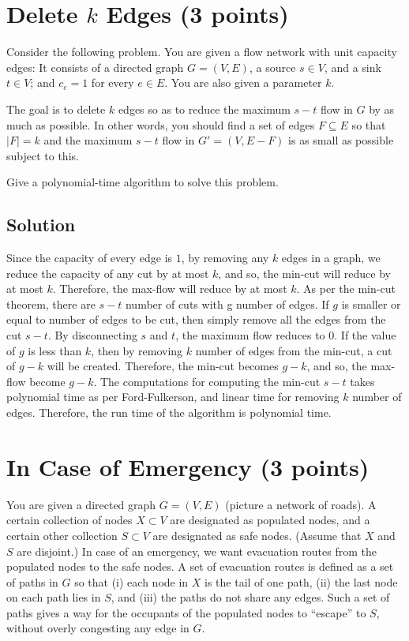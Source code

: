 \documentclass[letter,11pt]{article}
\begin{document}
\section{Delete $k$ Edges (3 points)}

Consider the following problem. You are given a flow network with unit capacity edges: It consists of a directed graph $G = (V, E)$, a source $s \in V$, and a sink $t \in V$; and $c_e = 1$ for every $e \in E$. You are also given a parameter $k$. 


The goal is to delete $k$ edges so as to reduce the maximum $s-t$ flow in $G$ by as much as possible. In other words, you should find a set of edges $F \subseteq E$ so that $|F| = k$ and the maximum $s-t$ flow in $G' = (V, E - F)$ is as small as possible subject to this. 


Give a polynomial-time algorithm to solve this problem.

\subsection{Solution}

Since the capacity of every edge is $1$, by removing any $k$ edges in a graph, we reduce the capacity of any cut by at most $k$, and so, the min-cut will reduce by at most $k$. Therefore, the max-flow will reduce by at most $k$. As per the min-cut theorem, there are $s-t$ number of cuts with g number of edges. If $g$ is smaller or equal to number of edges to be cut, then simply remove all the edges from the cut $s-t$. By disconnecting $s$ and $t$, the maximum flow reduces to 0. If the value of $g$ is less than $k$, then by removing $k$ number of edges from the min-cut, a cut of $g-k$ will be created. Therefore, the min-cut becomes $g-k$, and so, the max-flow become $g-k$. The computations for computing the min-cut $s-t$ takes polynomial time as per Ford-Fulkerson, and linear time for removing $k$ number of edges. Therefore, the run time of the algorithm is polynomial time.




\section{In Case of Emergency (3 points)}

You are given a directed graph $G = (V, E)$ (picture a network of roads). A certain collection of nodes $X \subset V$ are designated as populated nodes, and a certain other collection $S \subset V$ are designated as safe nodes. (Assume that $X$ and $S$ are disjoint.) In case of an emergency, we want evacuation routes from the populated nodes to the safe nodes. A set of evacuation routes is defined as a set of paths in $G$ so that (i) each node in $X$ is the tail of one path, (ii) the last node on each path lies in $S$, and (iii) the paths do not share any edges. Such a set of paths gives a way for the occupants of the populated nodes to “escape” to $S$, without overly congesting any edge in $G$.
\end{document}
